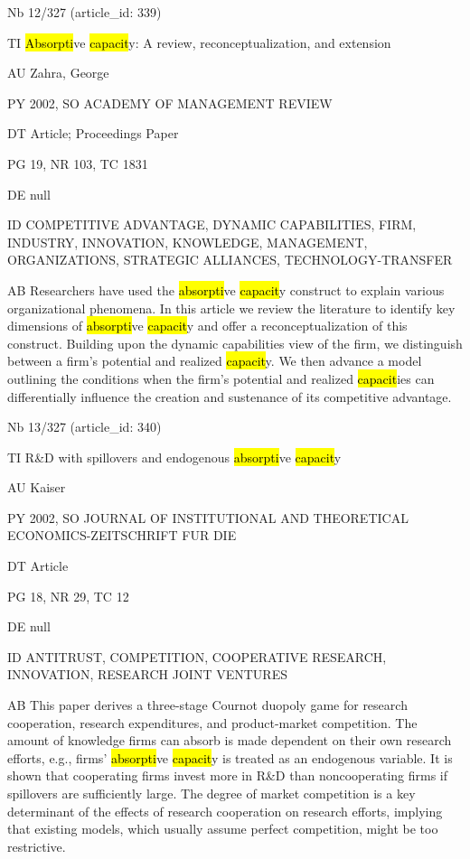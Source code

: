 \documentclass[a4paper]{article}
\begin{document}
\vspace*{-2cm}
Nb \tabto{0cm}12/327 (article\_id: 339)\par
TI \tabto{0cm}\hl{Absorpti}ve \hl{capacit}y: A review, reconceptualization, and extension\par
AU \tabto{0cm}Zahra, George\par
PY \tabto{0cm}2002, SO ACADEMY OF MANAGEMENT REVIEW\par
DT \tabto{0cm}Article; Proceedings Paper\par
PG \tabto{0cm}19, NR 103, TC 1831\par
DE \tabto{0cm}null\par
ID \tabto{0cm}COMPETITIVE ADVANTAGE, DYNAMIC CAPABILITIES, FIRM, INDUSTRY, INNOVATION, KNOWLEDGE, MANAGEMENT, ORGANIZATIONS, STRATEGIC ALLIANCES, TECHNOLOGY-TRANSFER\par
AB \tabto{0cm}Researchers have used the \hl{absorpti}ve \hl{capacit}y construct to explain various organizational phenomena. In this article we review the literature to identify key dimensions of \hl{absorpti}ve \hl{capacit}y and offer a reconceptualization of this construct. Building upon the dynamic capabilities view of the firm, we distinguish between a firm's potential and realized \hl{capacit}y. We then advance a model outlining the conditions when the firm's potential and realized \hl{capacit}ies can differentially influence the creation and sustenance of its competitive advantage.\par
\clearpage

\vspace*{-2cm}
Nb \tabto{0cm}13/327 (article\_id: 340)\par
TI \tabto{0cm}R\&D with spillovers and endogenous \hl{absorpti}ve \hl{capacit}y\par
AU \tabto{0cm}Kaiser\par
PY \tabto{0cm}2002, SO JOURNAL OF INSTITUTIONAL AND THEORETICAL ECONOMICS-ZEITSCHRIFT FUR DIE\par
DT \tabto{0cm}Article\par
PG \tabto{0cm}18, NR 29, TC 12\par
DE \tabto{0cm}null\par
ID \tabto{0cm}ANTITRUST, COMPETITION, COOPERATIVE RESEARCH, INNOVATION, RESEARCH JOINT VENTURES\par
AB \tabto{0cm}This paper derives a three-stage Cournot duopoly game for research cooperation, research expenditures, and product-market competition. The amount of knowledge firms can absorb is made dependent on their own research efforts, e.g., firms' \hl{absorpti}ve \hl{capacit}y is treated as an endogenous variable. It is shown that cooperating firms invest more in R\&D than noncooperating firms if spillovers are sufficiently large. The degree of market competition is a key determinant of the effects of research cooperation on research efforts, implying that existing models, which usually assume perfect competition, might be too restrictive.\par
\clearpage
\end{document}
